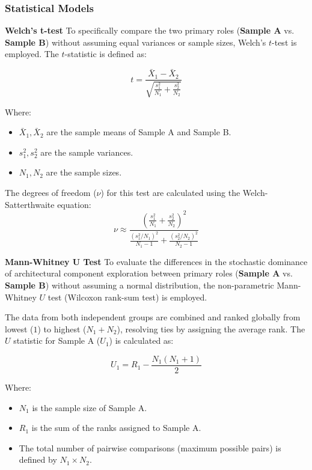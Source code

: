 \subsubsection*{Statistical Models}

\textbf{Welch's t-test}
To specifically compare the two primary roles (\textbf{Sample A} vs. \textbf{Sample B}) without assuming equal variances or sample sizes, Welch's $t$-test is employed. The $t$-statistic is defined as:

\begin{equation}
    t = \frac{\bar{X}_1 - \bar{X}_2}{\sqrt{\frac{s_1^2}{N_1} + \frac{s_2^2}{N_2}}}
\end{equation}

Where:
\begin{itemize}
    \item $\bar{X}_1, \bar{X}_2$ are the sample means of Sample A and Sample B.
    \item $s_1^2, s_2^2$ are the sample variances.
    \item $N_1, N_2$ are the sample sizes.
\end{itemize}

The degrees of freedom ($\nu$) for this test are calculated using the Welch-Satterthwaite equation:
\begin{equation}
    \nu \approx \frac{\left(\frac{s_1^2}{N_1} + \frac{s_2^2}{N_2}\right)^2}{\frac{(s_1^2/N_1)^2}{N_1-1} + \frac{(s_2^2/N_2)^2}{N_2-1}}
\end{equation}


\textbf{Mann-Whitney U Test}
To evaluate the differences in the stochastic dominance of architectural component exploration between primary roles (\textbf{Sample A} vs. \textbf{Sample B}) without assuming a normal distribution, the non-parametric Mann-Whitney $U$ test (Wilcoxon rank-sum test) is employed. 

The data from both independent groups are combined and ranked globally from lowest ($1$) to highest ($N_1 + N_2$), resolving ties by assigning the average rank. The $U$ statistic for Sample A ($U_1$) is calculated as:

\begin{equation}
    U_1 = R_1 - \frac{N_1(N_1 + 1)}{2}
\end{equation}

Where:
\begin{itemize}
    \item $N_1$ is the sample size of Sample A.
    \item $R_1$ is the sum of the ranks assigned to Sample A.
    \item The total number of pairwise comparisons (maximum possible pairs) is defined by $N_1 \times N_2$.
\end{itemize}

